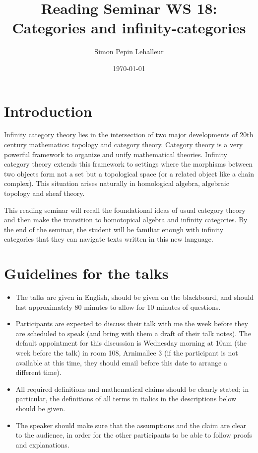 \documentclass{amsart}
\date{\today}
\title{Reading Seminar WS 18: Categories and infinity-categories}
\author{Simon Pepin Lehalleur}
\theoremstyle{definition}
\theoremstyle{remark}
\begin{document}
\maketitle

\section*{Introduction}

Infinity category theory lies in the intersection of two major developments of 20th century mathematics: topology and category theory. Category theory is a very powerful framework to organize and unify mathematical theories. Infinity category theory extends this framework to settings where the morphisms between two objects form not a set but a topological space (or a related object like a chain complex). This situation arises naturally in homological algebra, algebraic topology and sheaf theory. 

This reading seminar will recall the foundational ideas of usual category theory and then make the transition to homotopical algebra and infinity categories. By the end of the seminar, the student will be familiar enough with infinity categories that they can navigate texts written in this new language.

\section*{Guidelines for the talks}

\begin{itemize}
\item The talks are given in English, should be given on the blackboard, and should last approximately 80 minutes to
allow for 10 minutes of questions.
\item Participants are expected to discuss their talk with me the week before they are scheduled to
speak (and bring with them a draft of their talk notes). The default appointment for this
discussion is Wednesday morning at 10am (the week before the talk) in room 108, Arnimallee 3 (if the participant
is not available at this time, they should email before this date to arrange a different time).
\item All required definitions and mathematical claims should be clearly stated; in particular, the
  definitions of all terms in italics in the descriptions below should be given.
\item The speaker should make sure that the assumptions and the claim are clear to the audience, in order for the
other participants to be able to follow proofs and explanations.
\end{itemize}
\end{document}
